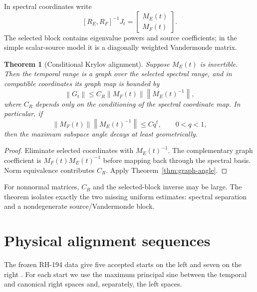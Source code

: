 \documentclass[12pt]{article}
\newtheorem{theorem}{Theorem}[section]
\theoremstyle{remark}
\newcommand{\norm}[1]{\left\lVert#1\right\rVert}
\begin{document}
In spectral coordinates write
\begin{equation}\label{eq:blocks}
 [R_E,R_F]^{-1}J_t=\begin{bmatrix}M_E(t)\\M_F(t)\end{bmatrix}.
\end{equation}
The selected block contains eigenvalue powers and source coefficients; in
the simple scalar-source model it is a diagonally weighted Vandermonde
matrix.

\begin{theorem}[Conditional Krylov alignment]\label{thm:conditional}
Suppose $M_E(t)$ is invertible.  Then the temporal range is a graph over the
selected spectral range, and in compatible coordinates its graph map is
bounded by
\begin{equation}\label{eq:graph-bound}
 \norm{G_t}
 \le C_R\norm{M_F(t)}\norm{M_E(t)^{-1}},
\end{equation}
where $C_R$ depends only on the conditioning of the spectral coordinate
map.  In particular, if
\begin{equation}\label{eq:decay-hypothesis}
 \norm{M_F(t)}\norm{M_E(t)^{-1}}\le Cq^t,
 \qquad 0<q<1,
\end{equation}
then the maximum subspace angle decays at least geometrically.
\end{theorem}

\begin{proof}
Eliminate selected coordinates with $M_E(t)^{-1}$.  The complementary graph
coefficient is $M_F(t)M_E(t)^{-1}$ before mapping back through the spectral
basis.  Norm equivalence contributes $C_R$.  Apply
Theorem~\ref{thm:graph-angle}.
\end{proof}

For nonnormal matrices, $C_R$ and the selected-block inverse may be large.
The theorem isolates exactly the two missing uniform estimates: spectral
separation and a nondegenerate source/Vandermonde block.

\section{Physical alignment sequences}

The frozen RH-194 data give five accepted starts on the left and seven on
the right \citep{WangRH194}.  For each start we use the maximum principal
sine between the temporal and canonical right spaces and, separately, the
left spaces.
\end{document}

